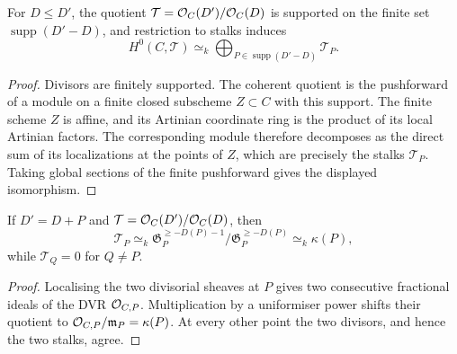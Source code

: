 \begin{proposition}
  \label{mk-thm:adelic_finite_support_quotient_sections}
  \notready
  For \(D\le D'\), the quotient
  \(\mathcal T=\mathcal{O}_{C}(D')/\mathcal{O}_{C}(D)\) is supported on the finite set
  \(\operatorname{supp}(D'-D)\), and restriction to stalks induces
  \[
    H^0(C,\mathcal T)\simeq_k
      \bigoplus_{P\in\operatorname{supp}(D'-D)}\mathcal T_P.
  \]
\end{proposition}
\begin{proof}
  Divisors are finitely supported.  The coherent quotient is the pushforward
  of a module on a finite closed subscheme \(Z\subset C\) with this support.
  The finite scheme \(Z\) is affine, and its Artinian coordinate ring is the
  product of its local Artinian factors.  The corresponding module therefore
  decomposes as the direct sum of its localizations at the points of \(Z\),
  which are precisely the stalks \(\mathcal T_P\).  Taking global sections of
  the finite pushforward gives the displayed isomorphism.
\end{proof}

\begin{proposition}
  \label{mk-thm:adelic_twist_stalk_quotient}
  \notready
  If \(D'=D+P\) and
  \(\mathcal T=\mathcal{O}_{C}(D')/\mathcal{O}_{C}(D)\), then
  \[
    \mathcal T_P\simeq_k
      \mathfrak G_P^{\ge-D(P)-1}/\mathfrak G_P^{\ge-D(P)}
      \simeq_k\kappa(P),
  \]
  while \(\mathcal T_Q=0\) for \(Q\ne P\).
\end{proposition}
\begin{proof}
  Localising the two divisorial sheaves at \(P\) gives two consecutive
  fractional ideals of the DVR \(\mathcal{O}_{C,P}\).  Multiplication by a
  uniformiser power shifts their quotient to
  \(\mathcal{O}_{C,P}/\mathfrak m_P=\kappa(P)\).  At every other point the two
  divisors, and hence the two stalks, agree.
\end{proof}

